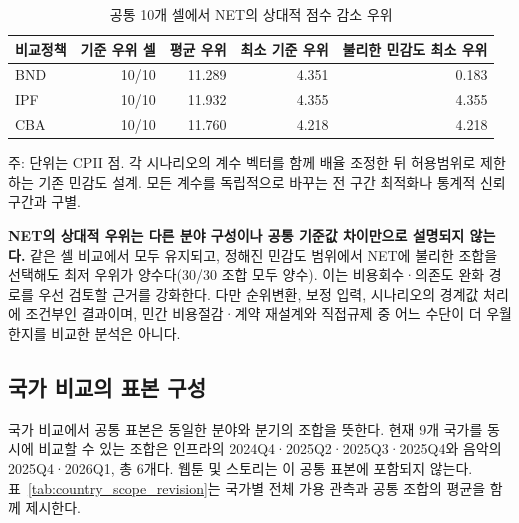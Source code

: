 \documentclass[11pt,a4paper]{report}
\begin{document}
\begin{table}[H]
\centering
\small
\caption{공통 10개 셀에서 NET의 상대적 점수 감소 우위}
\begin{tabular}{@{}lrrrr@{}}
\toprule
\rowcolor{ReportTableHead}
비교정책 & 기준 우위 셀 & 평균 우위 & 최소 기준 우위 & 불리한 민감도 최소 우위\\
\midrule
BND & 10/10 & 11.289 & 4.351 & 0.183\\
IPF & 10/10 & 11.932 & 4.355 & 4.355\\
CBA & 10/10 & 11.760 & 4.218 & 4.218\\
\bottomrule
\end{tabular}
\par\smallskip
\begin{minipage}{\linewidth}
\footnotesize\raggedright 주: 단위는 CPII 점. 각 시나리오의 계수 벡터를 함께 배율 조정한 뒤 허용범위로 제한하는 기존 민감도 설계. 모든 계수를 독립적으로 바꾸는 전 구간 최적화나 통계적 신뢰구간과 구별.
\end{minipage}
\end{table}

\textbf{NET의 상대적 우위는 다른 분야 구성이나 공통 기준값 차이만으로 설명되지 않는다.} 같은 셀 비교에서 모두 유지되고, 정해진 민감도 범위에서 NET에 불리한 조합을 선택해도 최저 우위가 양수다(30/30 조합 모두 양수). 이는 비용회수·의존도 완화 경로를 우선 검토할 근거를 강화한다. 다만 순위변환, 보정 입력, 시나리오의 경계값 처리에 조건부인 결과이며, 민간 비용절감·계약 재설계와 직접규제 중 어느 수단이 더 우월한지를 비교한 분석은 아니다.

\subsection{국가 비교의 표본 구성}
국가 비교에서 공통 표본은 동일한 분야와 분기의 조합을 뜻한다. 현재 9개 국가를 동시에 비교할 수 있는 조합은 인프라의 2024Q4·2025Q2·2025Q3·2025Q4와 음악의 2025Q4·2026Q1, 총 6개다. 웹툰 및 스토리는 이 공통 표본에 포함되지 않는다. 표~\ref{tab:country_scope_revision}는 국가별 전체 가용 관측과 공통 조합의 평균을 함께 제시한다.
\end{document}
